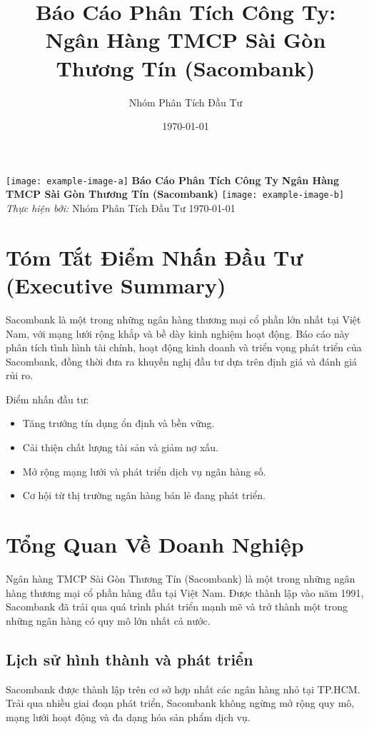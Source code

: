 \documentclass[11pt]{article}
\title{Báo Cáo Phân Tích Công Ty: Ngân Hàng TMCP Sài Gòn Thương Tín (Sacombank)}
\author{Nhóm Phân Tích Đầu Tư}
\date{\today}
\begin{document}
\begin{titlepage}
\centering
\texttt{[image: example-image-a]} %
\vspace{1cm}
\textbf{\LARGE Báo Cáo Phân Tích Công Ty}
\vspace{0.5cm}
\textbf{\Large Ngân Hàng TMCP Sài Gòn Thương Tín (Sacombank)}
\vspace{1cm}
\texttt{[image: example-image-b]} %
\vspace{2cm}
\textit{Thực hiện bởi:}
\vspace{0.5cm}
Nhóm Phân Tích Đầu Tư
\vspace{1cm}
\today
\end{titlepage}

\tableofcontents

\section{Tóm Tắt Điểm Nhấn Đầu Tư (Executive Summary)}

Sacombank là một trong những ngân hàng thương mại cổ phần lớn nhất tại Việt Nam, với mạng lưới rộng khắp và bề dày kinh nghiệm hoạt động. Báo cáo này phân tích tình hình tài chính, hoạt động kinh doanh và triển vọng phát triển của Sacombank, đồng thời đưa ra khuyến nghị đầu tư dựa trên định giá và đánh giá rủi ro.

Điểm nhấn đầu tư:
\begin{itemize}
    \item Tăng trưởng tín dụng ổn định và bền vững.
    \item Cải thiện chất lượng tài sản và giảm nợ xấu.
    \item Mở rộng mạng lưới và phát triển dịch vụ ngân hàng số.
    \item Cơ hội từ thị trường ngân hàng bán lẻ đang phát triển.
\end{itemize}

\section{Tổng Quan Về Doanh Nghiệp}

Ngân hàng TMCP Sài Gòn Thương Tín (Sacombank) là một trong những ngân hàng thương mại cổ phần hàng đầu tại Việt Nam. Được thành lập vào năm 1991, Sacombank đã trải qua quá trình phát triển mạnh mẽ và trở thành một trong những ngân hàng có quy mô lớn nhất cả nước.

\subsection{Lịch sử hình thành và phát triển}
Sacombank được thành lập trên cơ sở hợp nhất các ngân hàng nhỏ tại TP.HCM. Trải qua nhiều giai đoạn phát triển, Sacombank không ngừng mở rộng quy mô, mạng lưới hoạt động và đa dạng hóa sản phẩm dịch vụ.
\end{document}
